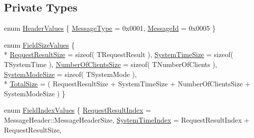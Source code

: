 \subsection*{Private Types}
\begin{DoxyCompactItemize}
\item 
enum \hyperlink{class_terra_swarm_1_1_synchronous_1_1_client_connection_response_ae5b6f6ce8e9057779e6115b9d10f9f27}{Header\-Values} \{ \hyperlink{class_terra_swarm_1_1_synchronous_1_1_client_connection_response_ae5b6f6ce8e9057779e6115b9d10f9f27a3d9f125f956d841cb53726088daf9f4d}{Message\-Type} = 0x0001, 
\hyperlink{class_terra_swarm_1_1_synchronous_1_1_client_connection_response_ae5b6f6ce8e9057779e6115b9d10f9f27a6a76dfe62910631da6f001cf65d1ab73}{Message\-Id} = 0x0005
 \}
\item 
enum \hyperlink{class_terra_swarm_1_1_synchronous_1_1_client_connection_response_a3933c56d09c6ccf4f1b533024d9d4b08}{Field\-Size\-Values} \{ \\*
\hyperlink{class_terra_swarm_1_1_synchronous_1_1_client_connection_response_a3933c56d09c6ccf4f1b533024d9d4b08aec725d8333b75b6c1cf36a1703d8712f}{Request\-Result\-Size} = sizeof( T\-Request\-Result ), 
\hyperlink{class_terra_swarm_1_1_synchronous_1_1_client_connection_response_a3933c56d09c6ccf4f1b533024d9d4b08ace1096317246657c7174cc95e7ae42fd}{System\-Time\-Size} = sizeof( T\-System\-Time ), 
\hyperlink{class_terra_swarm_1_1_synchronous_1_1_client_connection_response_a3933c56d09c6ccf4f1b533024d9d4b08ad751beae96e2b6b6d55e322c762772c1}{Number\-Of\-Clients\-Size} = sizeof( T\-Number\-Of\-Clients ), 
\hyperlink{class_terra_swarm_1_1_synchronous_1_1_client_connection_response_a3933c56d09c6ccf4f1b533024d9d4b08a967e285d0517d9d1920b562699ed8080}{System\-Mode\-Size} = sizeof( T\-System\-Mode ), 
\\*
\hyperlink{class_terra_swarm_1_1_synchronous_1_1_client_connection_response_a3933c56d09c6ccf4f1b533024d9d4b08a99f73dfa527e590c0f7cb12fe47e495a}{Total\-Size} = ( Request\-Result\-Size + System\-Time\-Size + Number\-Of\-Clients\-Size + System\-Mode\-Size )
 \}
\item 
enum \hyperlink{class_terra_swarm_1_1_synchronous_1_1_client_connection_response_a4cbf4ea0e840420400a931390a8acfbd}{Field\-Index\-Values} \{ \hyperlink{class_terra_swarm_1_1_synchronous_1_1_client_connection_response_a4cbf4ea0e840420400a931390a8acfbda71c63341170df807c76e11e47c8cb62e}{Request\-Result\-Index} = Message\-Header\-:\-:Message\-Header\-Size, 
\hyperlink{class_terra_swarm_1_1_synchronous_1_1_client_connection_response_a4cbf4ea0e840420400a931390a8acfbda2a8e1ab11473138d8b95056ea19323ac}{System\-Time\-Index} = Request\-Result\-Index + Request\-Result\-Size, 

\end{DoxyCompactItemize}
